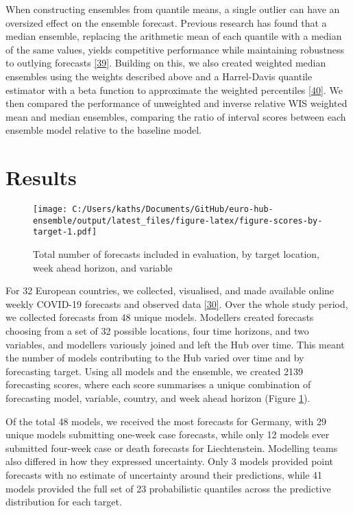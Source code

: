 \documentclass[
]{article}
\begin{document}
When constructing ensembles from quantile means, a single outlier can have an oversized effect on the ensemble forecast. Previous research has found that a median ensemble, replacing the arithmetic mean of each quantile with a median of the same values, yields competitive performance while maintaining robustness to outlying forecasts \protect\hyperlink{ref-rayComparingTrainedUntrained2022}{{[}39{]}}. Building on this, we also created weighted median ensembles using the weights described above and a Harrel-Davis quantile estimator with a beta function to approximate the weighted percentiles \protect\hyperlink{ref-harrellNewDistributionfreeQuantile1982}{{[}40{]}}. We then compared the performance of unweighted and inverse relative WIS weighted mean and median ensembles, comparing the ratio of interval scores between each ensemble model relative to the baseline model.

\hypertarget{results}{%
\section{Results}\label{results}}

\begin{figure}
\centering
\texttt{[image: C:/Users/kaths/Documents/GitHub/euro-hub-ensemble/output/latest\_files/figure-latex/figure-scores-by-target-1.pdf]}
\caption{\label{fig:figure-scores-by-target}Total number of forecasts included in evaluation, by target location, week ahead horizon, and variable}
\end{figure}

For 32 European countries, we collected, visualised, and made available online weekly COVID-19 forecasts and observed data \protect\hyperlink{ref-katharine_sherratt_2022_7356267}{{[}30{]}}. Over the whole study period, we collected forecasts from 48 unique models. Modellers created forecasts choosing from a set of 32 possible locations, four time horizons, and two variables, and modellers variously joined and left the Hub over time. This meant the number of models contributing to the Hub varied over time and by forecasting target. Using all models and the ensemble, we created 2139 forecasting scores, where each score summarises a unique combination of forecasting model, variable, country, and week ahead horizon (Figure \ref{fig:figure-scores-by-target}).

Of the total 48 models, we received the most forecasts for Germany, with 29 unique models submitting one-week case forecasts, while only 12 models ever submitted four-week case or death forecasts for Liechtenstein. Modelling teams also differed in how they expressed uncertainty. Only 3 models provided point forecasts with no estimate of uncertainty around their predictions, while 41 models provided the full set of 23 probabilistic quantiles across the predictive distribution for each target.
\end{document}
